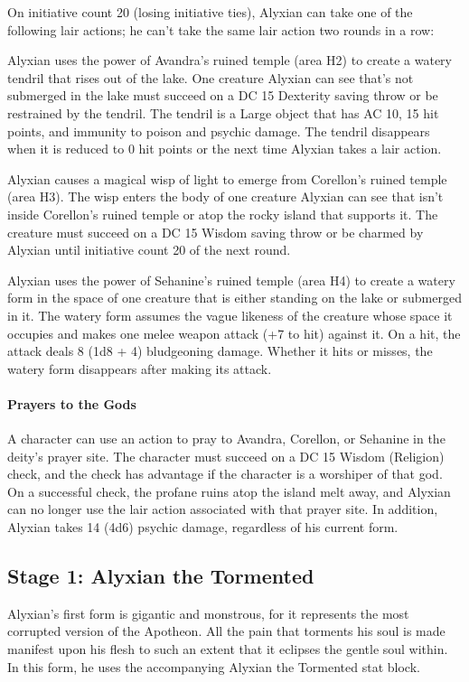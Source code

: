 \documentclass[10pt,a4paper,twoside,bg=print,twocolumn,openany,nodeprecatedcode]{dndbook}
\begin{document}
On initiative count 20 (losing initiative ties), Alyxian can take one of the following lair actions; he can't take the same lair action two rounds in a row:


\begin{description}[nolistsep]
\item[Avandra's Grasp.]
Alyxian uses the power of Avandra's ruined temple (area H2) to create a watery tendril that rises out of the lake. One creature Alyxian can see that's not submerged in the lake must succeed on a DC 15 Dexterity saving throw or be restrained by the tendril. The tendril is a Large object that has AC 10, 15 hit points, and immunity to poison and psychic damage. The tendril disappears when it is reduced to 0 hit points or the next time Alyxian takes a lair action.
\item[Corellon's Charm.]
Alyxian causes a magical wisp of light to emerge from Corellon's ruined temple (area H3). The wisp enters the body of one creature Alyxian can see that isn't inside Corellon's ruined temple or atop the rocky island that supports it. The creature must succeed on a DC 15 Wisdom saving throw or be charmed by Alyxian until initiative count 20 of the next round.
\item[Sehanine's Torment.]
Alyxian uses the power of Sehanine's ruined temple (area H4) to create a watery form in the space of one creature that is either standing on the lake or submerged in it. The watery form assumes the vague likeness of the creature whose space it occupies and makes one melee weapon attack (+7 to hit) against it. On a hit, the attack deals 8 (1d8 + 4) bludgeoning damage. Whether it hits or misses, the watery form disappears after making its attack.
\end{description}



\paragraph{Prayers to the Gods}
A character can use an action to pray to Avandra, Corellon, or Sehanine in the deity's prayer site. The character must succeed on a DC 15 Wisdom (Religion) check, and the check has advantage if the character is a worshiper of that god. On a successful check, the profane ruins atop the island melt away, and Alyxian can no longer use the lair action associated with that prayer site. In addition, Alyxian takes 14 (4d6) psychic damage, regardless of his current form.


\subsection{Stage 1: Alyxian the Tormented}
Alyxian's first form is gigantic and monstrous, for it represents the most corrupted version of the Apotheon. All the pain that torments his soul is made manifest upon his flesh to such an extent that it eclipses the gentle soul within. In this form, he uses the accompanying Alyxian the Tormented stat block.
\end{document}
